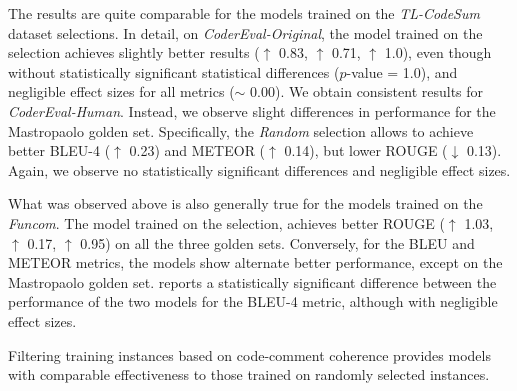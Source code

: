The results are quite comparable for the models trained on the \textit{TL-CodeSum} dataset selections. In detail, on \textit{CoderEval-Original}, the model trained on the  selection achieves slightly better results ($\uparrow$ 0.83, $\uparrow$ 0.71, $\uparrow$ 1.0), even though without statistically significant statistical differences ($p$-value = 1.0), and negligible effect sizes for all metrics ($\sim$ 0.00). We obtain consistent results for \textit{CoderEval-Human}. Instead, we observe slight differences in performance for the Mastropaolo \etal golden set. Specifically, the \textit{Random} selection allows to achieve better BLEU-4 ($\uparrow$ 0.23) and METEOR ($\uparrow$ 0.14), but lower ROUGE ($\downarrow$ 0.13). Again, we observe no statistically significant differences and negligible effect sizes.

What was observed above is also generally true for the models trained on the \textit{Funcom}. The model trained on the  selection, achieves better ROUGE ($\uparrow$ 1.03, $\uparrow$ 0.17, $\uparrow$ 0.95) on all the three golden sets. Conversely, for the BLEU and METEOR metrics, the models show alternate better performance, except on the Mastropaolo \etal golden set.  reports a statistically significant difference between the performance of the two models for the BLEU-4 metric, although with negligible effect sizes.

\begin{tcolorbox}[
	colframe=black!100!white, colback=black!10!white,
	coltitle=white, colbacktitle=black!,
	title=Answer to RQ$_{2}$,
	fonttitle=\bfseries,
	rounded corners,
	boxrule=0.5mm,
	width=\linewidth,
	breakable
	]
	Filtering training instances based on code-comment coherence provides models with comparable effectiveness to those trained on randomly selected instances.
\end{tcolorbox}
